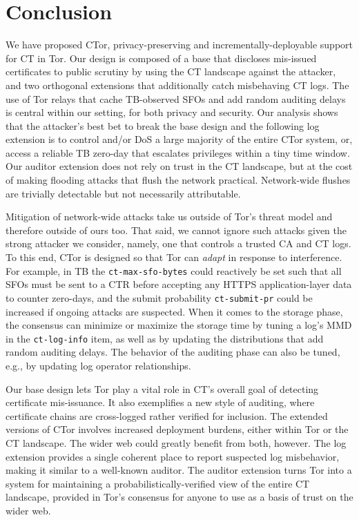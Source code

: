 \section{Conclusion} \label{sec:conclusion} 

We have proposed CTor, privacy-preserving and incrementally-deployable support
for CT in Tor.  Our design is composed of a base that discloses mis-issued
certificates to public scrutiny by using the CT landscape against the attacker,
and two orthogonal extensions that additionally catch misbehaving CT logs.  The
use of Tor relays that cache TB-observed SFOs and add random auditing delays is
central within our setting, for both privacy and security.  Our analysis shows
that the attacker's best bet to break the base design and the following log
extension is to control and/or DoS a large majority of the entire CTor system,
or, access a reliable TB zero-day that escalates privileges within a tiny time
window.  Our auditor extension does not rely on trust in the CT landscape, but
at the cost of making flooding attacks that flush the network practical.
Network-wide flushes are trivially detectable but not necessarily attributable.

Mitigation of network-wide attacks take us outside of Tor's threat model and
therefore outside of ours too.  That said, we cannot ignore such attacks given
the strong attacker we consider, namely, one that controls a trusted CA and
CT logs.  To this end, CTor is designed so that Tor can \emph{adapt} in response
to interference.  For example, in TB the \texttt{ct-max-sfo-bytes} could
reactively be set such that all SFOs must be sent to a CTR before accepting any
HTTPS application-layer data to counter zero-days, and the submit probability
\texttt{ct-submit-pr} could be increased if ongoing attacks are suspected.  When
it comes to the storage phase, the consensus can minimize or maximize the
storage time by tuning a log's MMD in the \texttt{ct-log-info} item, as well as
by updating the distributions that add random auditing delays.  
The behavior of the
auditing phase can also be tuned, e.g., by updating log operator relationships.

Our base design lets Tor play a vital role in CT's overall goal of detecting
certificate mis-issuance.  It also exemplifies a new style of auditing, where
certificate chains are cross-logged rather verified for inclusion.  The extended
versions of CTor involves increased deployment burdens, either within Tor or the
CT landscape.  The wider web could greatly benefit from both, however.  The log
extension provides a single coherent place to report suspected log misbehavior,
making it similar to a well-known auditor.  The auditor extension turns Tor into
a system for maintaining a probabilistically-verified view of the entire CT
landscape, provided in Tor's consensus for anyone to use as a basis of trust on
the wider web.
